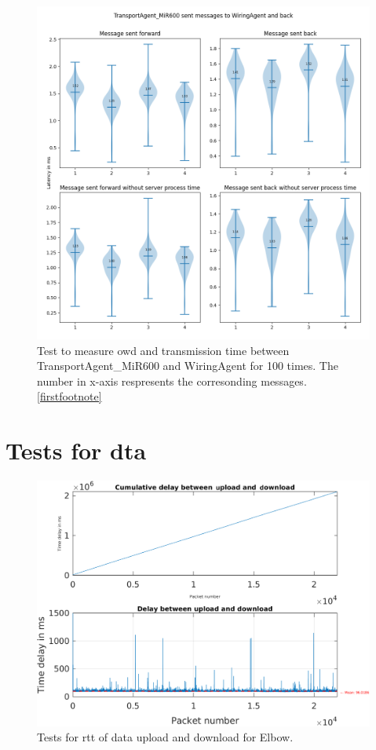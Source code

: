 \begin{figure}[p]
    \includegraphics[width=\textwidth]{figures/appendix/usecase/violin_TransportAgent_MiR600_to_WiringAgent.png}
    \centering
    \caption{Test to measure \gls{owd} and transmission time between TransportAgent\_MiR600 and 
    WiringAgent for 100 times. The number in x-axis respresents the 
    corresonding messages. \protect\ref{firstfootnote}}
    \label{fig: violin-T600-WI}
\end{figure}





\newpage
\section{Tests for \gls{dta}}\label{chap: append-DTagent}
\begin{figure}[h]
    \centering
    \includegraphics[width=\textwidth]{figures/appendix/DT/Delay_UploadDownloadCycleTime_Elbow.pdf}\hfill 
    \caption{Tests for \gls{rtt} of data upload and download for Elbow.} \label{fig: UD-cycle-Elbow}
\end{figure}

